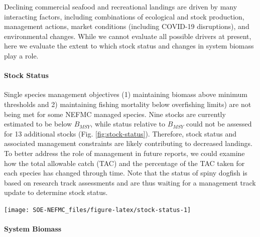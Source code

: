 \documentclass[
  10pt,
]{article}
\let\origfigure\figure
\let\endorigfigure\endfigure
\renewenvironment{figure}[1][2] {
    \expandafter\origfigure\expandafter[H]
} {
    \endorigfigure
}
\begin{document}
Declining commercial seafood and recreational landings are driven by many interacting factors, including combinations of ecological and stock production, management actions, market conditions (including COVID-19 disruptions), and environmental changes. While we cannot evaluate all possible drivers at present, here we evaluate the extent to which stock status and changes in system biomass play a role.

\hypertarget{stock-status}{%
\paragraph{Stock Status}\label{stock-status}}

Single species management objectives (1) maintaining biomass above minimum thresholds and 2) maintaining fishing mortality below overfishing limits) are not being met for some NEFMC managed species. Nine stocks are currently estimated to be below \(B_{MSY}\), while status relative to \(B_{MSY}\) could not be assessed for 13 additional stocks (Fig. \ref{fig:stock-status}). Therefore, stock status and associated management constraints are likely contributing to decreased landings. To better address the role of management in future reports, we could examine how the total allowable catch (TAC) and the percentage of the TAC taken for each species has changed through time. Note that the status of spiny dogfish is based on research track assessments and are thus waiting for a management track update to determine stock status.

\begin{figure}

{\centering \texttt{[image: SOE-NEFMC\_files/figure-latex/stock-status-1]} 

}

\caption{Summary of single species status for NEFMC and jointly federally managed stocks (goosefish and spiny dogfish).  The dotted vertical line at one is the target biomass reference point of B\textsubscript{MSY}.  The dashed lines are the management thresholds of B\textsubscript{MSY} (vertical) or F\textsubscript{MSY} (horizontal).  Text color denotes which quadrant of the plot the stocks are in with orange text below F\textsubscript{MSY} and B\textsubscript{MSY}, green above F\textsubscript{MSY} and below B\textsubscript{MSY}, and blue above both F\textsubscript{MSY} and B\textsubscript{MSY}.}\label{fig:stock-status}
\end{figure}

\hypertarget{system-biomass}{%
\paragraph{System Biomass}\label{system-biomass}}
\end{document}
